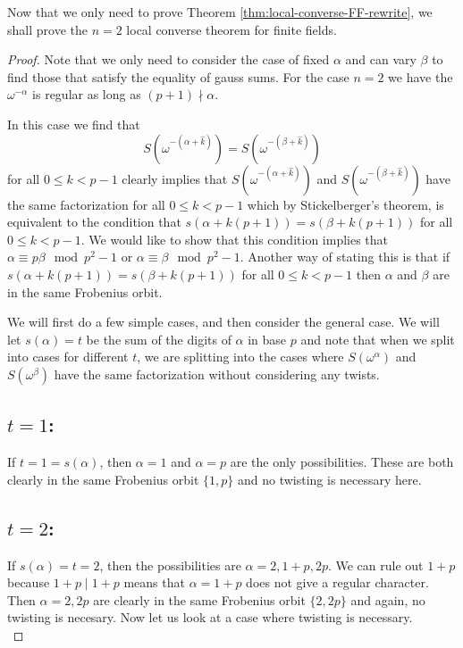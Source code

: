 Now that we only need to prove Theorem \ref{thm:local-converse-FF-rewrite}, we shall prove the $n=2$ local converse theorem for finite fields.

\begin{proof}
Note that we only need to consider the case of fixed $\alpha$ and can vary $\beta$ to find those that satisfy the equality of gauss sums. 
For the case $n=2$ we have the $\omega^{-\alpha}$ is regular as long as $(p+1)\nmid \alpha$.

In this case we find that \[S(\omega^{-(\alpha + \hat{k})}) = S(\omega^{-(\beta + \hat{k})})\] for all $0 \leq k < p-1$ clearly implies that $S(\omega^{-(\alpha+\hat{k})})$ and $S(\omega^{-(\beta + \hat{k})})$ have the same factorization for all $0 \leq k < p-1$ which by Stickelberger's theorem, is equivalent to the condition that $s(\alpha + k(p+1)) = s(\beta + k(p+1))$ for all $0 \leq k < p-1$. 
We would like to show that this condition implies that $\alpha \equiv p \beta \mod p^2 -1$ or $\alpha \equiv \beta \mod p^2 - 1$. 
Another way of stating this is that if $s(\alpha + k(p+1)) = s(\beta+k(p+1))$ for all $0 \leq k < p-1$ then $\alpha$ and $\beta$ are in the same Frobenius orbit.

We will first do a few simple cases, and then consider the general case.
We will let $s(\alpha) = t$ be the sum of the digits of $\alpha$ in base $p$ and note that when we split into cases for different $t$, we are splitting into the cases where $S(\omega^\alpha)$ and  $S(\omega^\beta)$ have the same factorization without considering any twists.
\\

\subsection{$t = 1$:} If $t = 1 = s(\alpha)$, then $\alpha = 1$ and $\alpha = p$ are the only possibilities. 
These are both clearly in the same Frobenius orbit $\{1,p\}$ and no twisting is necessary here.
\\

\subsection{$t = 2$:} If $s(\alpha) = t = 2$, then the possibilities are $\alpha = 2, 1+p, 2p$. 
We can rule out $1+p$ because $1+p \mid 1+p$ means that $\alpha = 1+p$ does not give a regular character. 
Then $\alpha = 2, 2p$ are clearly in the same Frobenius orbit $\{2,2p\}$ and again, no twisting is necesary. 
Now let us look at a case where twisting is necessary.
\\


\end{proof}
